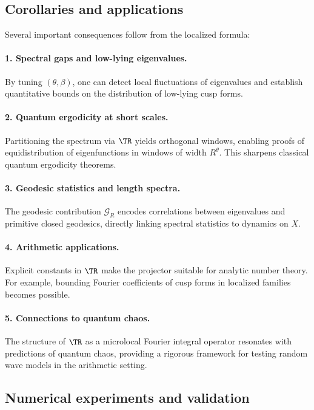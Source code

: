 \subsection{Corollaries and applications}
\label{subsec:corollaries}

Several important consequences follow from the localized formula:

\paragraph{1. Spectral gaps and low-lying eigenvalues.}  
By tuning $(\theta,\beta)$, one can detect local fluctuations of eigenvalues and establish quantitative bounds on the distribution of low-lying cusp forms.

\paragraph{2. Quantum ergodicity at short scales.}  
Partitioning the spectrum via $\TR$ yields orthogonal windows, enabling proofs of equidistribution of eigenfunctions in windows of width $R^\theta$. This sharpens classical quantum ergodicity theorems.

\paragraph{3. Geodesic statistics and length spectra.}  
The geodesic contribution $\mathcal{G}_R$ encodes correlations between eigenvalues and primitive closed geodesics, directly linking spectral statistics to dynamics on $X$.

\paragraph{4. Arithmetic applications.}  
Explicit constants in $\TR$ make the projector suitable for analytic number theory. For example, bounding Fourier coefficients of cusp forms in localized families becomes possible.

\paragraph{5. Connections to quantum chaos.}  
The structure of $\TR$ as a microlocal Fourier integral operator resonates with predictions of quantum chaos, providing a rigorous framework for testing random wave models in the arithmetic setting.

\subsection{Numerical experiments and validation}
\label{subsec:numerics}

